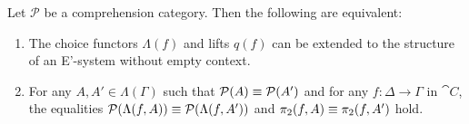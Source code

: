 \begin{comment}
\begin{defn}
Let $f_0\defeq f:\Delta\to\Gamma$ be a morphism of $\cat{C}$, the base category of a
split comprehension category $\mathcal{P}$ wich a choice $j$ of cartesian lifts.
By induction we define an element $\Lambda(f,A)\in\Lambda(\Delta)$ together with
a morphism $q(f,A):\mathrm{dom}(\mathcal{P}(\Lambda(f,A)))\to 
\mathrm{dom}(\mathcal{P}(A))$, for any $A\jdeq (A_1,\ldots,A_n) 
\in\Lambda(\Gamma)$.

For $n\jdeq 0$, i.e.~if $A$ is the empty sequence, we let $\Lambda(f,A)$ be the 
empty sequence, and $q(f,A) \jdeq f$. For the inductive step, consider a 
sequence $A_1,\ldots,A_{n+1}\in \Lambda(\Gamma)$. Then we define
\begin{align*}
\Lambda(f,A) & \jdeq \mathrm{dom}(j(A_{n+1},q(f,(A_1,\ldots,A_n))))
\intertext{and}
q(f,A) & \jdeq \mathrm{dom}(\mathcal{P}(j(A_{n+1},q(f,(A_1,\ldots,A_n)))))
\end{align*}
where we consider in the definition of $q(f,A)$, $\mathrm{dom}$ to be the 
domain functor from $\cat{C}^{\to}\to\cat{C}$. 
\end{defn}

\begin{rmk}
It follows immediately from the definition of comprehension categories and the
pasting lemma of pullbacks, that the square
\begin{equation*}
\begin{tikzcd}[column sep=large]
\mathrm{dom}(\mathcal{P}(\Lambda(f,A))) \arrow[r,"{q(f,A)}"] \arrow[d,swap,"{\mathcal{P}(\Lambda(f,A))}"] & \mathrm{dom}(\mathcal{P}(A)) \arrow[d,"{\mathcal{P}(A)}"] \\
\Delta \arrow[r,"f"] & \Gamma
\end{tikzcd}
\end{equation*}
is a pullback square.
\end{rmk}
\end{comment}

\begin{thm}
Let $\mathcal{P}$ be a comprehension category. Then the following are equivalent:
\begin{enumerate}
\item The choice functors $\Lambda(f)$ and lifts $q(f)$ can be extended to the 
structure of an E'-system without empty context.
\item For any
$A,A'\in\Lambda(\Gamma)$ such that $\mathcal{P}(A)\equiv\mathcal{P}(A')$
and for any $f:\Delta\to\Gamma$ in $\cat{C}$, the equalities
$\mathcal{P}(\Lambda(f,A))\equiv\mathcal{P}(\Lambda(f,A'))$ and
$\pi_2(f,A)\equiv\pi_2(f,A')$ hold. 
\end{enumerate}
\end{thm}

